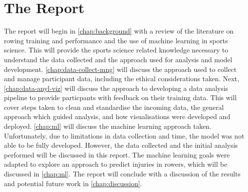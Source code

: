 \section{The Report}
The report will begin in \autoref{chap:background} with a review of the literature on rowing training and performance and the use of machine learning in sports science. This will provide the sports science related knowledge necessary to understand the data collected and the approach used for analysis and model development. \autoref{chap:data-collect-mng} will discuss the approach used to collect and manage participant data, including the ethical considerations taken. Next, \autoref{chap:data-anyl-viz} will discuss the approach to developing a data analysis pipeline to provide particpants with feedback on their training data. This will cover steps taken to clean and standardise the incoming data, the general approach which guided analysis, and how visualisations were developed and deployed. \autoref{chap:ml} will discuss the machine learning approach taken. Unfortunately, due to limitations in data collection and time, the model was not able to be fully developed. However, the data collected and the initial analysis performed will be discussed in this report. The machine learning goals were adapted to explore an approach to predict injuries in rowers, which will be discussed in \autoref{chap:ml}. The report will conclude with a discussion of the results and potential future work in \autoref{chap:discussion}.
